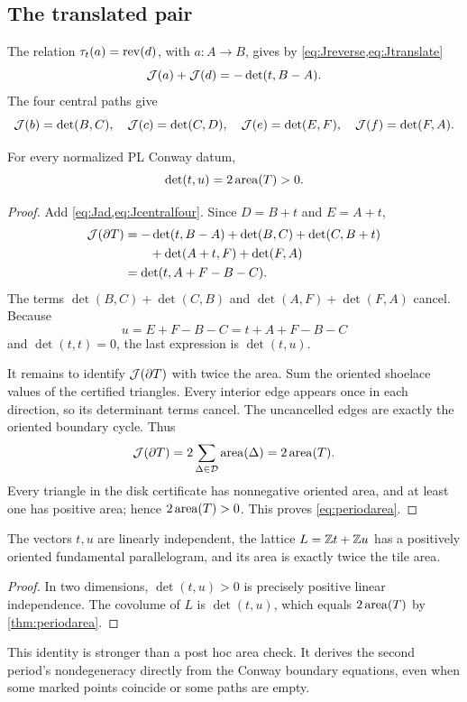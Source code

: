 \subsection{The translated pair}

The relation \(\tau_{t}(a)=\operatorname{rev}(d)\), with \(a:A\to B\), gives by \cref{eq:Jreverse,eq:Jtranslate}
\begin{equation}
 \mathcal J(a)+\mathcal J(d)=-\det(t,B-A).
 \label{eq:Jad}
\end{equation}
The four central paths give
\begin{equation}
 \mathcal J(b)=\det(B,C),\quad
 \mathcal J(c)=\det(C,D),\quad
 \mathcal J(e)=\det(E,F),\quad
 \mathcal J(f)=\det(F,A).
 \label{eq:Jcentralfour}
\end{equation}

\begin{theorem}
\label{thm:periodarea}
For every normalized PL Conway datum,
\begin{equation}
 \det(t,u)=2\operatorname{area}(T)>0.
 \label{eq:periodarea}
\end{equation}
\end{theorem}
\begin{proof}
Add \cref{eq:Jad,eq:Jcentralfour}.  Since \(D=B+t\) and \(E=A+t\),
\begin{align*}
 \mathcal J(\partial T)
 &= -\det(t,B-A)
    +\det(B,C)+\det(C,B+t)\\
 &\qquad +\det(A+t,F)+\det(F,A)\\
 &=\det(t,A+F-B-C).
\end{align*}
The terms \(\det(B,C)+\det(C,B)\) and \(\det(A,F)+\det(F,A)\) cancel.  Because
\[
 u=E+F-B-C=t+A+F-B-C
\]
and \(\det(t,t)=0\), the last expression is \(\det(t,u)\).

It remains to identify \(\mathcal J(\partial T)\) with twice the area.  Sum the oriented shoelace values of the certified triangles.  Every interior edge appears once in each direction, so its determinant terms cancel.  The uncancelled edges are exactly the oriented boundary cycle.  Thus
\[
 \mathcal J(\partial T)=2\sum_{\Delta\in\mathcal D}\operatorname{area}(\Delta)=2\operatorname{area}(T).
\]
Every triangle in the disk certificate has nonnegative oriented area, and at least one has positive area; hence \(2\operatorname{area}(T)>0\).  This proves \cref{eq:periodarea}.
\end{proof}

\begin{corollary}
\label{cor:lattice}
The vectors \(t,u\) are linearly independent, the lattice \(L=\mathbb Z t+\mathbb Z u\) has a positively oriented fundamental parallelogram, and its area is exactly twice the tile area.
\end{corollary}
\begin{proof}
In two dimensions, \(\det(t,u)>0\) is precisely positive linear independence.  The covolume of \(L\) is \(\det(t,u)\), which equals \(2\operatorname{area}(T)\) by \cref{thm:periodarea}.
\end{proof}

This identity is stronger than a post hoc area check.  It derives the second period's nondegeneracy directly from the Conway boundary equations, even when some marked points coincide or some paths are empty.
